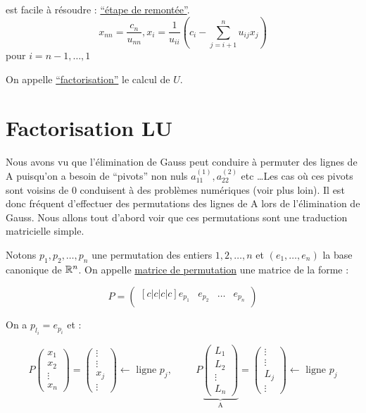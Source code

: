  est facile à résoudre : \underline{``étape de remontée''}.
\[
    x_{nn} = \frac{c_n}{u_{nn}}, x_i = \frac{1}{u_{ii}}(c_i - \sum_{j=i+1}^{n}u_{ij}x_j )
\] pour $i = n-1, \dots, 1$

\begin{remark}
    On appelle \underline{``factorisation''} le calcul de $U$.
\end{remark}









\section{Factorisation LU}
Nous avons vu que l'élimination de Gauss peut conduire à permuter des lignes de A puisqu'on a besoin de ``pivots'' non nuls $a_{11}^{(1)}, a_{22}^{(2)}$ etc \dots Les cas où ces pivots sont voisins de 0 conduisent à des problèmes numériques (voir plus loin). Il est donc fréquent d'effectuer des permutations des lignes de A lors de l'élimination de Gauss.
Nous allons tout d'abord voir que ces permutations sont une traduction matricielle simple.

Notons ${p_1,p_2,\dots,p_n}$ une permutation des entiers ${1,2,\dots,n}$ et $(e_1,\dots,e_n)$ la base canonique de $\mathbb{R}^n$. On appelle \underline{matrice de permutation} une matrice de la forme :

\[
    P =
    \begin{pmatrix}[c|c|c|c]
        e_{p_1} & e_{p_2} & \dots & e_{p_n}\\
\end{pmatrix} 
\]

On a $p_{l_i} = e_{p_i}$ et :

\[
    P
    \begin{pmatrix}
        x_1 \\ x_2 \\ \vdots \\ x_n
    \end{pmatrix}
    =
    \begin{pmatrix}
        \vdots \\ \vdots \\ x_j \\ \vdots
    \end{pmatrix}
    \text{$\leftarrow$ ligne $p_j$}, \hspace{1cm}
    P
    \underbrace{\begin{pmatrix}
        L_1 \\
        L_2 \\
        \vdots \\
        L_n
    \end{pmatrix}
    }_\text{A}
    =
    \begin{pmatrix}
        \vdots \\
        \vdots \\
        L_j \\ 
        \vdots
    \end{pmatrix}
    \text{$\leftarrow$ ligne $p_j$}
\]

